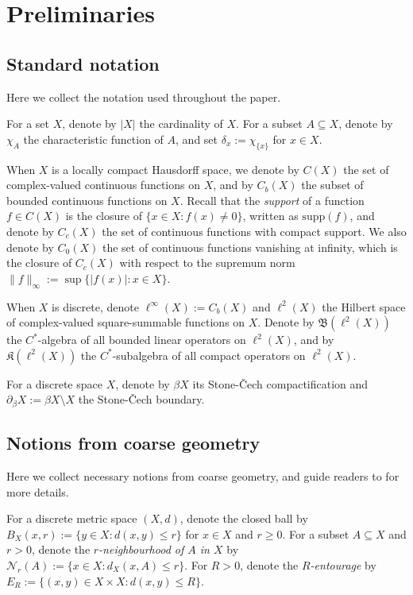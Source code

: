 \documentclass[12pt, a4paper]{amsart}
\numberwithin{equation}{section}
\theoremstyle{definition}
\theoremstyle{remark}
\def\Nd{\mathcal{N}}
\def\B{\mathfrak{B}}
\def\K{\mathfrak{K}}
\def\supp{\mathrm{supp}}
\begin{document}
\section{Preliminaries}\label{sec:pre}

\subsection{Standard notation} Here we collect the notation used throughout the paper.

For a set $X$, denote by $|X|$ the cardinality of $X$. For a subset $A \subseteq X$, denote by $\chi_{A}$ the characteristic function of $A$, and set $\delta_x:=\chi_{\{x\}}$ for $x\in X$. 


When $X$ is a locally compact Hausdorff space, we denote by $C(X)$ the set of complex-valued continuous functions on $X$, and by $C_b(X)$ the subset of bounded continuous functions on $X$. Recall that the \textit{support} of a function $f\in C(X)$ is the closure of $\{ x\in X: f(x)\neq 0\}$, written as $\supp(f)$, and denote by $C_c(X)$ the set of continuous functions with compact support. We also denote by $C_0(X)$ the set of continuous functions vanishing at infinity, which is the closure of $C_c(X)$ with respect to the supremum norm $\|f\|_\infty:=\sup\{|f(x)|: x\in X\}$.

When $X$ is discrete, denote $\ell^\infty(X):=C_b(X)$ and $\ell^2(X)$ the Hilbert space of complex-valued square-summable functions on $X$. Denote by $\B(\ell^2(X))$ the $C^*$-algebra of all bounded linear operators on $\ell^2(X)$, and by $\K(\ell^2(X))$ the $C^*$-subalgebra of all compact operators on $\ell^2(X)$. 

For a discrete space $X$, denote by $\beta X$ its Stone-\v{C}ech compactification and $\partial_\beta X:=\beta X \setminus X$ the Stone-\v{C}ech boundary.


\subsection{Notions from coarse geometry}\label{ssec:notions from coarse geometry}

Here we collect necessary notions from coarse geometry, and guide readers to \cite{NY12, Roe03} for more details. 

For a discrete metric space $(X,d)$, denote the closed ball by $B_{X}(x,r):=\{y\in X: d(x,y)\leq r\}$ for $x\in X$ and $r\geq 0$. For a subset $A\subseteq X$ and $r>0$, denote the \emph{$r$-neighbourhood of $A$ in $X$} by $\Nd_r(A):=\{x\in X: d_X(x,A) \leq r\}$. For $R>0$, denote the \emph{$R$-entourage} by $E_R :=\{(x,y) \in X \times X: d(x,y) \leq R\}$. 
\end{document}
